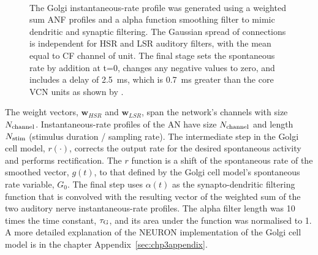 \begin{figure}[h!]
  \centering
  \resizebox{0.9\textwidth}{!}{}\\
  \caption{The Golgi instantaneous-rate profile was generated using a weighted
    sum ANF profiles and a alpha function smoothing filter to mimic dendritic
    and synaptic filtering. The Gaussian spread of connections is independent
    for HSR and LSR auditory filters, with the mean equal to CF channel of
    unit. The final stage sets the spontaneous rate by addition at t=0, changes
    any negative values to zero, and includes a delay of 2.5~ms, which is 0.7~ms
    greater than the core VCN units as shown by \citet{GhoshalKim:1997}.}
  \label{fig:GolgiDiagram}
\end{figure}


The weight vectors, $\mathbf{w}_{HSR}$ and $\mathbf{w}_{LSR}$, span the
network's channels with size $N_{\rm channel}$. Instantaneous-rate profiles of
the AN have size $N_{\rm channel}$ and length $N_{\rm stim}$ (stimulus duration
/ sampling rate).  The intermediate step in the Golgi cell model, $r(\cdot)$,
corrects the output rate for the desired spontaneous activity and performs
rectification.  The $r$ function is a shift of the spontaneous rate of the
smoothed vector, $g(t)$, to that defined by the Golgi cell model's spontaneous
rate variable, $G_0$. The final step uses $\alpha(t)$ as the synapto-dendritic
filtering function that is convolved with the resulting vector of the weighted
sum of the two auditory nerve instantaneous-rate profiles. The alpha filter
length was 10 times the time constant, $\protect\tau_{\rm G}$, and its area under the function
was normalised to 1.  A more detailed explanation of the NEURON implementation
of the Golgi cell model is in the chapter
Appendix~\ref{sec:chp3appendix}.  %



